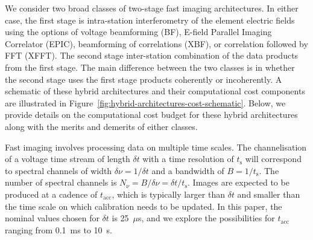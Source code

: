 \documentclass[
  journal=pasa,
  manuscript=article-type,
  year=2020,
  volume=37,
]{cup-journal}
\begin{document}
We consider two broad classes of two-stage fast imaging architectures. In either case, the first stage is intra-station interferometry of the element electric fields using the options of voltage beamforming (BF), E-field Parallel Imaging Correlator (EPIC), beamforming of correlations (XBF), or correlation followed by FFT (XFFT). The second stage inter-station combination of the data products from the first stage. The main difference between the two classes is in whether the second stage uses the first stage products coherently or incoherently. A schematic of these hybrid architectures and their computational cost components are illustrated in Figure~\ref{fig:hybrid-architectures-cost-schematic}. Below, we provide details on the computational cost budget for these hybrid architectures along with the merits and demerits of either classes. 

Fast imaging involves processing data on multiple time scales. The channelisation of a voltage time stream of length $\delta t$ with a time resolution of $t_\textrm{s}$ will correspond to spectral channels of width $\delta\nu=1/\delta t$ and a bandwidth of $B=1/t_\textrm{s}$. The number of spectral channels is $N_\nu=B/\delta\nu=\delta t/t_\textrm{s}$. Images are expected to be produced at a cadence of $t_\textrm{acc}$, which is typically larger than $\delta t$ and smaller than the time scale on which calibration needs to be updated. In this paper, the nominal values chosen for $\delta t$ is 25~$\mu$s, and we explore the possibilities for $t_\textrm{acc}$ ranging from 0.1~ms to 10~s.  
\end{document}
